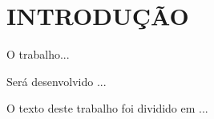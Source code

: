 \chapter{INTRODUÇÃO}
\label{chap:introducao}

O trabalho...

Será desenvolvido ... 

O texto deste trabalho foi dividido em ...

